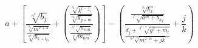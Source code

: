 \documentclass[10pt,a4paper]{article}
\author{Papp Tamás}
\begin{document}
$$a+\left[ \frac{\sqrt[a^2]{b_j}}{\frac{\sqrt[b_x]{m^{2+3}}}{\sqrt[w]{g_{k+l_m}}}} + \left( \frac{\frac{\sqrt[c_k]{k^{l-j_i}}}{\sqrt[n_k]{g_{g+m}}}}{\frac{\sqrt[h^{x+2}]{n_{mn}}}{\sqrt[k^t]{m_{nm}}}} \right) \right] - \left( \frac{\frac{\sqrt[h_l]{k_x}}{\sqrt[s^{k-l_j}]{a^m+b_{hj}}}}{\frac{d_j+ \sqrt[g^{h+m}]{g^2+m_l}}{\sqrt[m^{k\div j}]{m^{2\cdot n}\div jk}}} + \frac{j}{k} \right) $$
\end{document}
